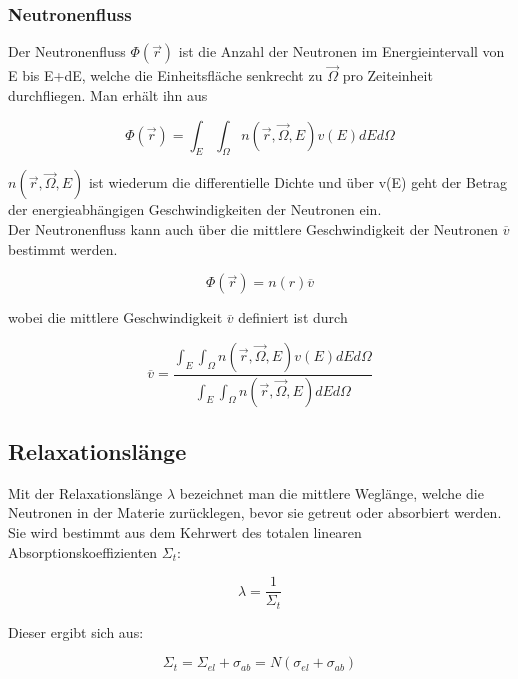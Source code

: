 \documentclass[a4paper,titlepage]{scrartcl}
\numberwithin{equation}{section}
\begin{document}
\subsubsection{Neutronenfluss}

Der Neutronenfluss $\Phi (\vec{r})$ ist die Anzahl der Neutronen im Energieintervall von E bis E+dE, welche die Einheitsfläche senkrecht zu $\vec{\Omega}$ pro Zeiteinheit durchfliegen. Man erhält ihn aus

\begin{equation}
\Phi (\vec{r})= \int_E \int_{\Omega} n(\vec{r},\vec{\Omega},E) v(E) dEd\Omega
\end{equation}

$n(\vec{r},\vec{\Omega},E)$ ist wiederum die differentielle Dichte und über v(E) geht der Betrag der energieabhängigen Geschwindigkeiten der Neutronen ein. \\
Der Neutronenfluss kann auch über die mittlere Geschwindigkeit der Neutronen $\overline{v}$ bestimmt werden.

\begin{equation}
\Phi (\vec{r})= n(r)\overline{v}
\end{equation}

wobei die mittlere Geschwindigkeit $\overline{v}$ definiert ist durch

\begin{equation*}
\overline{v}= \frac{\int_E \int_{\Omega} n(\vec{r},\vec{\Omega},E) v(E) dEd\Omega}{\int_E \int_{\Omega} n(\vec{r},\vec{\Omega},E) dEd\Omega}
\end{equation*}

\subsection{Relaxationslänge}
Mit der Relaxationslänge $\lambda$ bezeichnet man die mittlere Weglänge, welche die Neutronen in der Materie zurücklegen, bevor sie getreut oder absorbiert werden. Sie wird bestimmt aus dem Kehrwert des totalen linearen Absorptionskoeffizienten $\Sigma_t$:

\begin{equation}
\lambda = \frac{1}{\Sigma_t}
\end{equation}

Dieser ergibt sich aus:

\begin{equation}
\Sigma_t = \Sigma_{el} + \sigma_{ab}= N (\sigma_{el} +\sigma_{ab})
\end{equation}
\end{document}
